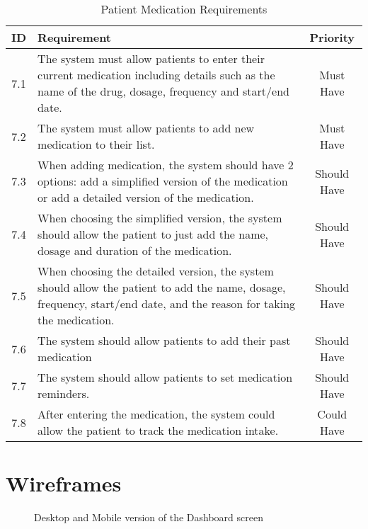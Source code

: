 \begin{table}[h!]
    \centering
    \begin{tabular}{|c|p{10cm}|c|}
    \hline
    \textbf{ID}  & \textbf{Requirement}  & \textbf{Priority} \\ \hline
    7.1  & The system must allow patients to enter their current medication including details such as the name of the drug, dosage, frequency and start/end date. & Must Have \\ \hline
    7.2 & The system must allow patients to add new medication to their list. & Must Have \\ \hline
    7.3 & When adding medication, the system should have 2 options: add a simplified version of the medication or add a detailed version of the medication. & Should Have \\ \hline
    7.4 & When choosing the simplified version, the system should allow the patient to just add the name, dosage and duration of the medication. & Should Have \\ \hline
    7.5 & When choosing the detailed version, the system should allow the patient to add the name, dosage, frequency, start/end date, and the reason for taking the medication. & Should Have \\ \hline
    7.6  & The system should allow patients to add their past medication & Should Have \\ \hline
    7.7  & The system should allow patients to set medication reminders. & Should Have \\ \hline
    7.8 & After entering the medication, the system could allow the patient to track the medication intake. & Could Have \\ \hline

    \end{tabular}
    \caption{Patient Medication Requirements}
\end{table}

\chapter{Wireframes}\label{sec:wireframes}

\begin{figure}[ht]
    \centering
    \hspace{0.05\textwidth}
    \caption{Desktop and Mobile version of the Dashboard screen}
\end{figure}

